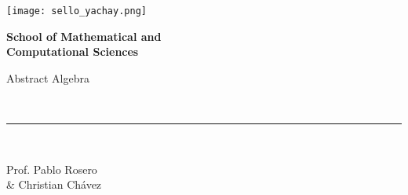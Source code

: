 \noindent
\begin{minipage}[c]{0.33\textwidth}
    \texttt{[image: sello\_yachay.png]}
\end{minipage}
\begin{minipage}[c]{0.37\textwidth}
    \textbf{\large School of Mathematical and\\ Computational Sciences}\par
    Abstract Algebra
\end{minipage}
~ 
\begin{minipage}[c]{3mm}
    \raggedleft
    \rule[1.5mm]{0.3mm}{15mm}
\end{minipage}
~ 
\begin{minipage}[c]{0.24\textwidth}
    \raggedleft
    Prof. Pablo Rosero\\
    \& Christian Chávez\\
    \contador{}
\end{minipage}

\vspace{1mm}
\noindent\hrulefill

\vspace{3mm}
